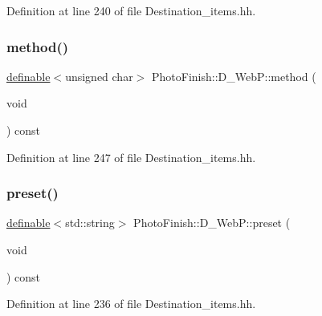 Definition at line 240 of file Destination\+\_\+items.\+hh.

\mbox{\label{class_photo_finish_1_1_d___web_p_aa465397235a743aeb0a0db57f488090b}} 
\subsubsection{\texorpdfstring{method()}{method()}}
{\footnotesize\ttfamily \hyperlink{class_photo_finish_1_1definable}{definable}$<$unsigned char$>$ Photo\+Finish\+::\+D\+\_\+\+Web\+P\+::method (\begin{DoxyParamCaption}\item[{void}]{ }\end{DoxyParamCaption}) const\hspace{0.3cm}{\ttfamily [inline]}}



Definition at line 247 of file Destination\+\_\+items.\+hh.

\mbox{\label{class_photo_finish_1_1_d___web_p_a16566874dd895f0d5c2f582945c51b4a}} 
\subsubsection{\texorpdfstring{preset()}{preset()}}
{\footnotesize\ttfamily \hyperlink{class_photo_finish_1_1definable}{definable}$<$std\+::string$>$ Photo\+Finish\+::\+D\+\_\+\+Web\+P\+::preset (\begin{DoxyParamCaption}\item[{void}]{ }\end{DoxyParamCaption}) const\hspace{0.3cm}{\ttfamily [inline]}}



Definition at line 236 of file Destination\+\_\+items.\+hh.

\mbox{\label{class_photo_finish_1_1_d___web_p_aefa18f92529cd3647eab20d394622dfb}} 
